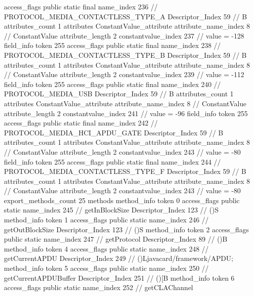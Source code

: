 {{{{{				access_flags	public static final
				name_index	236		// PROTOCOL_MEDIA_CONTACTLESS_TYPE_A
				Descriptor_Index	59		// B
				attributes_count	1
				attributes {
				ConstantValue_attribute {
					attribute_name_index	8		// ConstantValue
					attribute_length	2
					constantvalue_index	237		// value = -128
				}
				}
			}
			field_info {
				token	255
				access_flags	public static final
				name_index	238		// PROTOCOL_MEDIA_CONTACTLESS_TYPE_B
				Descriptor_Index	59		// B
				attributes_count	1
				attributes {
				ConstantValue_attribute {
					attribute_name_index	8		// ConstantValue
					attribute_length	2
					constantvalue_index	239		// value = -112
				}
				}
			}
			field_info {
				token	255
				access_flags	public static final
				name_index	240		// PROTOCOL_MEDIA_USB
				Descriptor_Index	59		// B
				attributes_count	1
				attributes {
				ConstantValue_attribute {
					attribute_name_index	8		// ConstantValue
					attribute_length	2
					constantvalue_index	241		// value = -96
				}
				}
			}
			field_info {
				token	255
				access_flags	public static final
				name_index	242		// PROTOCOL_MEDIA_HCI_APDU_GATE
				Descriptor_Index	59		// B
				attributes_count	1
				attributes {
				ConstantValue_attribute {
					attribute_name_index	8		// ConstantValue
					attribute_length	2
					constantvalue_index	243		// value = -80
				}
				}
			}
			field_info {
				token	255
				access_flags	public static final
				name_index	244		// PROTOCOL_MEDIA_CONTACTLESS_TYPE_F
				Descriptor_Index	59		// B
				attributes_count	1
				attributes {
				ConstantValue_attribute {
					attribute_name_index	8		// ConstantValue
					attribute_length	2
					constantvalue_index	243		// value = -80
				}
				}
			}
			}
			export_methods_count	25
			methods {
				method_info {
					token	0
					access_flags	public static
					name_index	245		// getInBlockSize
					Descriptor_Index	123		// ()S
				}
				method_info {
					token	1
					access_flags	public static
					name_index	246		// getOutBlockSize
					Descriptor_Index	123		// ()S
				}
				method_info {
					token	2
					access_flags	public static
					name_index	247		// getProtocol
					Descriptor_Index	89		// ()B
				}
				method_info {
					token	4
					access_flags	public static
					name_index	248		// getCurrentAPDU
					Descriptor_Index	249		// ()Ljavacard/framework/APDU;
				}
				method_info {
					token	5
					access_flags	public static
					name_index	250		// getCurrentAPDUBuffer
					Descriptor_Index	251		// ()[B
				}
				method_info {
					token	6
					access_flags	public static
					name_index	252		// getCLAChannel
}}}}}
